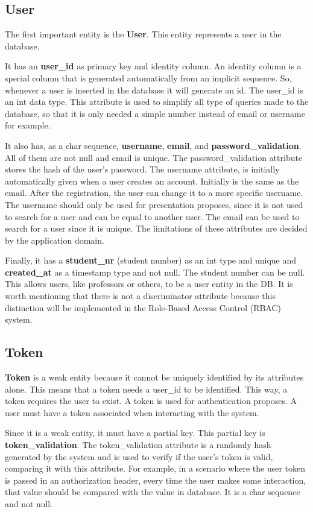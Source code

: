 \documentclass[a4paper,twoside,11pt]{article}
\begin{document}
\subsection*{User}
The first important entity is the \textbf{User}. This entity represents a user in the database.

It has an \textbf{user\_id} as primary key and identity column. An identity column is a special column that is generated automatically from an implicit sequence.
So, whenever a user is inserted in the database it will generate an id. The user\_id is an int data type. This attribute is used to simplify all type of queries made to the database, so that it is only needed a simple number instead of email or username for example. 

It also has, as a char sequence, \textbf{username}, \textbf{email}, and \textbf{password\_validation}. All of them are not null and email is unique. The password\_validation attribute stores the hash of the user's password.
The username attribute, is initially automatically given when a user creates an account. Initially is the same as the email. After the registration, the user can change it to a more specific username. The username should only be used for presentation proposes, since
it is not used to search for a user and can be equal to another user. The email can be used to search for a user since it is unique. The limitations of these attributes are decided by the application domain.

Finally, it has a \textbf{student\_nr} (student number) as an int type and unique and \textbf{created\_at} as a timestamp type and not null.
The student number can be null. This allows users, like professors or others, to be a user entity in the DB. It is worth mentioning that there is not a discriminator attribute because 
this distinction will be implemented in the Role-Based Access Control (RBAC) system.

\subsection*{Token}
\textbf{Token} is a weak entity because it cannot be uniquely identified by its attributes alone. This means that a token needs a user\_id to be identified. This way, a token requires the user to exist.
A token is used for authentication proposes. A user must have a token associated when interacting with the system. 

Since it is a weak entity, it must have a partial key. This partial key is \textbf{token\_validation}. The token\_validation attribute is a randomly hash generated by the system and is used to verify if the user's token is valid, comparing it with this attribute. 
For example, in a scenario where the user token is passed in an authorization header, every time the user makes some interaction, that value should be compared with the value in database. It is a char sequence and not null.
\end{document}
